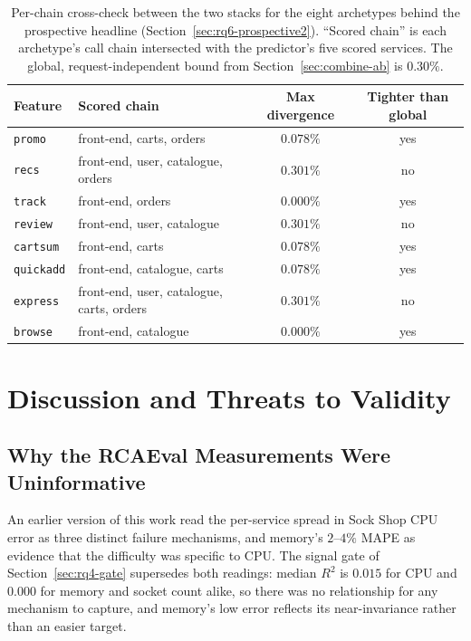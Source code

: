 \documentclass[journal, 10pt]{IEEEtran}
\begin{document}
\begin{table}[t]
\centering
\caption{Per-chain cross-check between the two stacks for the eight archetypes behind the prospective headline (Section~\ref{sec:rq6-prospective2}). ``Scored chain'' is each archetype's call chain intersected with the predictor's five scored services. The global, request-independent bound from Section~\ref{sec:combine-ab} is $0.30\%$.}
\label{tab:cross-check}
\begin{tabular}{llcc}
\toprule
Feature & Scored chain & Max divergence & Tighter than global \\
\midrule
\texttt{promo}    & front-end, carts, orders                           & $0.078\%$ & yes \\
\texttt{recs}     & front-end, user, catalogue, orders                 & $0.301\%$ & no  \\
\texttt{track}    & front-end, orders                                  & $0.000\%$ & yes \\
\texttt{review}   & front-end, user, catalogue                         & $0.301\%$ & no  \\
\texttt{cartsum}  & front-end, carts                                   & $0.078\%$ & yes \\
\texttt{quickadd} & front-end, catalogue, carts                        & $0.078\%$ & yes \\
\texttt{express}  & front-end, user, catalogue, carts, orders          & $0.301\%$ & no  \\
\texttt{browse}   & front-end, catalogue                               & $0.000\%$ & yes \\
\bottomrule
\end{tabular}
\end{table}


\section{Discussion and Threats to Validity}
\label{sec:discussion}

\subsection{Why the RCAEval Measurements Were Uninformative}
\label{sec:cpu-ceiling}
An earlier version of this work read the per-service spread in Sock Shop CPU
error as three distinct failure mechanisms, and memory's $2$--$4\%$ MAPE as
evidence that the difficulty was specific to CPU. The signal gate of
Section~\ref{sec:rq4-gate} supersedes both readings: median $R^2$ is $0.015$ for
CPU and $0.000$ for memory and socket count alike, so there
was no relationship for any mechanism to capture, and memory's low error reflects
its near-invariance rather than an easier target.
\end{document}

